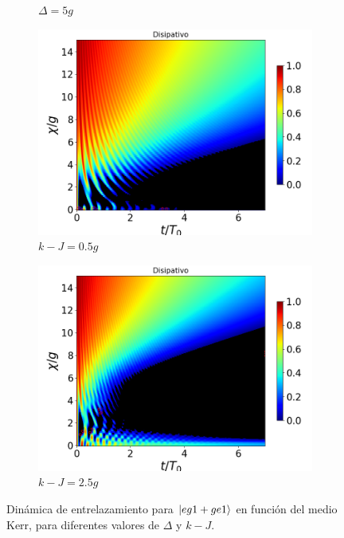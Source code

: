 \begin{figure}[h!]
\begin{subfigure}{0.49\textwidth}
        \caption{$\Delta=5g$}
        \label{fig4:concu x 1 d2}
    \end{subfigure}
    \vfill
    \begin{subfigure}{0.49\textwidth}
        \includegraphics[width=\textwidth]{figuras/ch4/concu/chi/eg1+ge1 d=0.0g k=0.5g J=0.0g gamma=0.25g concu chi dis.png}
        \caption{$k-J=0.5g$}
        \label{fig4:concu x 1 k1}
    \end{subfigure}
    \hfill
    \begin{subfigure}{0.49\textwidth}
        \includegraphics[width=\textwidth]{figuras/ch4/concu/chi/eg1+ge1 d=0.0g k=2.5g J=0.0g gamma=0.25g concu chi dis.png}
        \caption{$k-J=2.5g$}
        \label{fig4:concu x 1 k2}
    \end{subfigure}
    \caption{Dinámica de entrelazamiento para $\ket{eg1+ge1}$ en función del medio Kerr, para diferentes valores de $\Delta$ y $k-J$.}
    \label{fig4:concu x params 1}
\end{figure}
